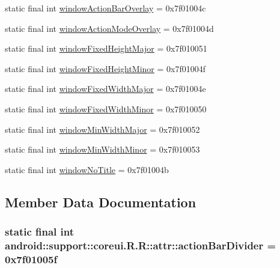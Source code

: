 \begin{CompactItemize}
\item 
static final int \hyperlink{classandroid_1_1support_1_1coreui_1_1_r_1_1attr_c1aa969225fa43a079be58a16c044c5e}{windowActionBarOverlay} = 0x7f01004c
\item 
static final int \hyperlink{classandroid_1_1support_1_1coreui_1_1_r_1_1attr_4e1f5681f1ae0addbb5466e15abade1c}{windowActionModeOverlay} = 0x7f01004d
\item 
static final int \hyperlink{classandroid_1_1support_1_1coreui_1_1_r_1_1attr_492c1e8a7ff7a75020e3d6b8a7bfd99d}{windowFixedHeightMajor} = 0x7f010051
\item 
static final int \hyperlink{classandroid_1_1support_1_1coreui_1_1_r_1_1attr_8f5b63549e03a6092fa7727c35b0ba0e}{windowFixedHeightMinor} = 0x7f01004f
\item 
static final int \hyperlink{classandroid_1_1support_1_1coreui_1_1_r_1_1attr_2e4a1e117103f53e765c5e6455e33420}{windowFixedWidthMajor} = 0x7f01004e
\item 
static final int \hyperlink{classandroid_1_1support_1_1coreui_1_1_r_1_1attr_288aa3980f226257e5335c221bfd0e26}{windowFixedWidthMinor} = 0x7f010050
\item 
static final int \hyperlink{classandroid_1_1support_1_1coreui_1_1_r_1_1attr_11a035840f46f9af985036156484e3f4}{windowMinWidthMajor} = 0x7f010052
\item 
static final int \hyperlink{classandroid_1_1support_1_1coreui_1_1_r_1_1attr_523c22b9d1affd1ce44ea19c525789bb}{windowMinWidthMinor} = 0x7f010053
\item 
static final int \hyperlink{classandroid_1_1support_1_1coreui_1_1_r_1_1attr_80ccc6b67e5838ed462f4681d2d2687a}{windowNoTitle} = 0x7f01004b
\end{CompactItemize}


\subsection{Member Data Documentation}
\hypertarget{classandroid_1_1support_1_1coreui_1_1_r_1_1attr_7f3e9074550ebc0d03a14cb5e92c9a38}{
\subsubsection[{actionBarDivider}]{\setlength{\rightskip}{0pt plus 5cm}static final int android::support::coreui.R.R::attr::actionBarDivider = 0x7f01005f}}
\label{classandroid_1_1support_1_1coreui_1_1_r_1_1attr_7f3e9074550ebc0d03a14cb5e92c9a38}


